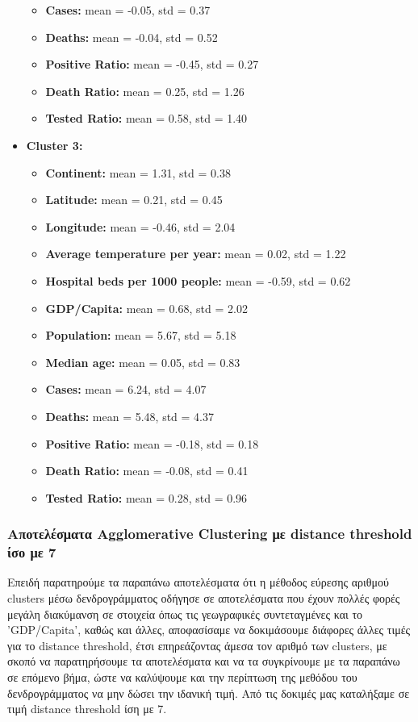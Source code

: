 \documentclass[12pt,a4paper]{article}
\begin{document}
\begin{itemize}
\begin{itemize}
            \item \textbf{Cases:} mean = -0.05, std = 0.37
            \item \textbf{Deaths:} mean = -0.04, std = 0.52
            \item \textbf{Positive Ratio:} mean = -0.45, std = 0.27
            \item \textbf{Death Ratio:} mean = 0.25, std = 1.26
            \item \textbf{Tested Ratio:} mean = 0.58, std = 1.40
        \end{itemize}
    \item \textbf{Cluster 3:} 
        \begin{itemize}
            \item \textbf{Continent:} mean = 1.31, std = 0.38
            \item \textbf{Latitude:} mean = 0.21, std = 0.45
            \item \textbf{Longitude:} mean = -0.46, std = 2.04
            \item \textbf{Average temperature per year:} mean = 0.02, std = 1.22
            \item \textbf{Hospital beds per 1000 people:} mean = -0.59, std = 0.62
            \item \textbf{GDP/Capita:} mean = 0.68, std = 2.02
            \item \textbf{Population:} mean = 5.67, std = 5.18
            \item \textbf{Median age:} mean = 0.05, std = 0.83
            \item \textbf{Cases:} mean = 6.24, std = 4.07
            \item \textbf{Deaths:} mean = 5.48, std = 4.37
            \item \textbf{Positive Ratio:} mean = -0.18, std = 0.18
            \item \textbf{Death Ratio:} mean = -0.08, std = 0.41
            \item \textbf{Tested Ratio:} mean = 0.28, std = 0.96
        \end{itemize}
\end{itemize}

\subsubsection{Αποτελέσματα Agglomerative Clustering με distance threshold ίσο με 7}

Επειδή παρατηρούμε τα παραπάνω αποτελέσματα ότι η μέθοδος εύρεσης αριθμού clusters μέσω δενδρογράμματος οδήγησε σε αποτελέσματα που έχουν πολλές φορές μεγάλη διακύμανση σε στοιχεία όπως τις γεωγραφικές συντεταγμένες και το 'GDP/Capita', καθώς και άλλες, αποφασίσαμε να δοκιμάσουμε διάφορες άλλες τιμές για το distance threshold, έτσι επηρεάζοντας άμεσα τον αριθμό των clusters, με σκοπό να παρατηρήσουμε τα αποτελέσματα και να τα συγκρίνουμε με τα παραπάνω σε επόμενο βήμα, ώστε να καλύψουμε και την περίπτωση της μεθόδου του δενδρογράμματος να μην δώσει την ιδανική τιμή. Από τις δοκιμές μας καταλήξαμε σε τιμή distance threshold ίση με 7.
\end{document}
